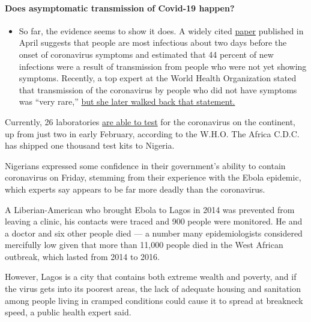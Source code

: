 \begin{itemize}
{  \paragraph{Does asymptomatic transmission of Covid-19
  happen?}\label{does-asymptomatic-transmission-of-covid-19-happen}}

  \begin{itemize}
  \tightlist
  \item
    So far, the evidence seems to show it does. A widely cited
    \href{https://www.nature.com/articles/s41591-020-0869-5}{paper}
    published in April suggests that people are most infectious about
    two days before the onset of coronavirus symptoms and estimated that
    44 percent of new infections were a result of transmission from
    people who were not yet showing symptoms. Recently, a top expert at
    the World Health Organization stated that transmission of the
    coronavirus by people who did not have symptoms was ``very rare,''
    \href{https://www.nytimes.com/2020/06/09/world/coronavirus-updates.html?action=click\&pgtype=Article\&state=default\&region=MAIN_CONTENT_3\&context=storylines_faq\#link-1f302e21}{but
    she later walked back that statement.}
  \end{itemize}
\end{itemize}

Currently, 26 laboratories
\href{https://www.afro.who.int/news/who-pledges-support-african-countries-joint-coronavirus-disease-preparedness-and-response}{are
able to test} for the coronavirus on the continent, up from just two in
early February, according to the W.H.O. The Africa C.D.C. has shipped
one thousand test kits to Nigeria.

Nigerians expressed some confidence in their government's ability to
contain coronavirus on Friday, stemming from their experience with the
Ebola epidemic, which experts say appears to be far more deadly than the
coronavirus.

A Liberian-American who brought Ebola to Lagos in 2014 was prevented
from leaving a clinic, his contacts were traced and 900 people were
monitored. He and a doctor and six other people died --- a number many
epidemiologists considered mercifully low given that more than 11,000
people died in the West African outbreak, which lasted from 2014 to
2016.

However, Lagos is a city that contains both extreme wealth and poverty,
and if the virus gets into its poorest areas, the lack of adequate
housing and sanitation among people living in cramped conditions could
cause it to spread at breakneck speed, a public health expert said.

